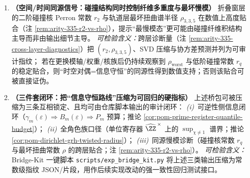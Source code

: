 \begin{enumerate}
  \item \textbf{（空间/时间同源信号：碰撞结构同时控制纤维多重度与最坏慢模）}
  折叠窗层的二阶碰撞核 Perron 常数 \(r_2\) 与轨道层最坏扭曲谱半径 \(\rho_{3,3,5}\) 在数值上高度贴合（注 \ref{rem:arity-335-r2-vs-rho}），提示“最慢模态”更可能由碰撞纤维积结构主导而非由输出细节主导。
  \emph{可检验含义：}跨层诊断量（注 \ref{rem:arity-335-cross-layer-diagnostics}）把 \((r_2,\rho_{3,3,5})\)、SVD 压缩与协方差预测并列为可审计指纹；
  若在更换模轴/权重/核族后仍持续观察到 \(\rho_{\mathrm{worst}}\) 与低阶碰撞常数 \(r_q\) 的稳定贴合，则“时空对偶=信息守恒”的同源性得到数值支持；否则该贴合可被直接证伪。

  \item \textbf{（三件套闭环：把“信息守恒路线”压缩为可回归的硬指标）}
  上述桥包可被压缩为三条互相锁定、且均可由仓库脚本输出的审计闭环：
  \emph{(i)}~可逆性侧信息闭环（\(\gamma_m(\varepsilon)\Rightarrow B_m(\varepsilon)\Rightarrow P_m\) 预算；推论 \ref{cor:pom-prime-register-quantile-budget}）；
  \emph{(ii)}~全角色族口径（单位寄存器 \(\widehat{\ZZ}^{\,\times}\) 上的 \(\sup_{\chi\neq 1}\) 谱界；推论 \ref{cor:pom-dirichlet-grh-twisted-radius}）；
  \emph{(iii)}~同源慢模诊断（碰撞核常数 \(r_q\) 与最坏扭曲常数 \(\rho\) 的跨层贴合；注 \ref{rem:arity-335-r2-vs-rho}）。
  \emph{可检验含义：}Bridge-Kit 一键脚本 \texttt{scripts/exp\_bridge\_kit.py} 将上述三类输出压缩为常数级指纹 JSON/片段，用作后续实现改动的强一致性回归测试接口。


\end{enumerate}

